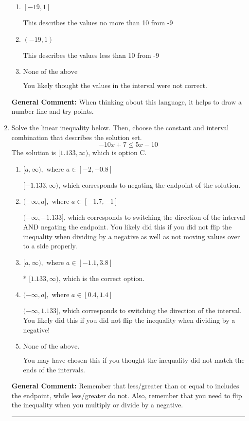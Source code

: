 \documentclass{extbook}[14pt]
\newcommand{\litem}[1]{\item #1

\rule{\textwidth}{0.4pt}}
\begin{document}
\begin{enumerate}
{\begin{enumerate}[label=\Alph*.]
This describes the values no less than 10 from -9
\item \( [-19, 1] \)

This describes the values no more than 10 from -9
\item \( (-19, 1) \)

This describes the values less than 10 from -9
\item \( \text{None of the above} \)

You likely thought the values in the interval were not correct.
\end{enumerate}

\textbf{General Comment:} When thinking about this language, it helps to draw a number line and try points.
}
\litem{
Solve the linear inequality below. Then, choose the constant and interval combination that describes the solution set.
\[ -10x + 7 \leq 5x -10 \]The solution is \( [1.133, \infty) \), which is option C.\begin{enumerate}[label=\Alph*.]
\item \( [a, \infty), \text{ where } a \in [-2, -0.8] \)

 $[-1.133, \infty)$, which corresponds to negating the endpoint of the solution.
\item \( (-\infty, a], \text{ where } a \in [-1.7, -1] \)

 $(-\infty, -1.133]$, which corresponds to switching the direction of the interval AND negating the endpoint. You likely did this if you did not flip the inequality when dividing by a negative as well as not moving values over to a side properly.
\item \( [a, \infty), \text{ where } a \in [-1.1, 3.8] \)

* $[1.133, \infty)$, which is the correct option.
\item \( (-\infty, a], \text{ where } a \in [0.4, 1.4] \)

 $(-\infty, 1.133]$, which corresponds to switching the direction of the interval. You likely did this if you did not flip the inequality when dividing by a negative!
\item \( \text{None of the above}. \)

You may have chosen this if you thought the inequality did not match the ends of the intervals.
\end{enumerate}

\textbf{General Comment:} Remember that less/greater than or equal to includes the endpoint, while less/greater do not. Also, remember that you need to flip the inequality when you multiply or divide by a negative.
}
\end{enumerate}
\end{document}
